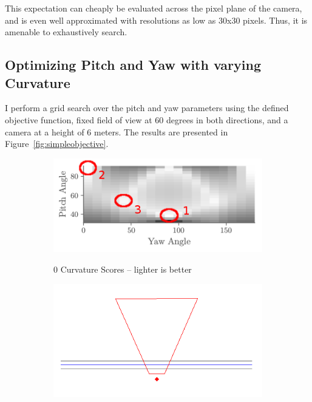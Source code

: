 \documentclass[a4paper,12pt,twoside,openright]{report}
\begin{document}
This expectation can cheaply be evaluated across the pixel plane of the camera, and is even
well approximated with resolutions as low as 30x30 pixels. Thus, it is amenable
to exhaustively search.

\subsection{Optimizing Pitch and Yaw with varying Curvature}

I perform a grid search over the pitch and yaw parameters using the defined
objective function, fixed field of view at 60 degrees in both directions,
and a camera at a height of 6 meters. The results are presented in Figure~\ref{fig:simpleobjective}.

\begin{figure}[h!]
    \begin{subfigure}[b]{0.45\textwidth}
    \centering
    \includegraphics[width=\textwidth]{figures/simple_objective/pitch_yaw_0_curvature_annotated.png}
    \label{fig:simpleobjective:0curvature}
    \caption{0 Curvature Scores -- lighter is better}
\end{subfigure}
\begin{subfigure}[b]{0.45\textwidth}
    \centering
    \includegraphics[width=\textwidth]{figures/simple_objective/0_curvature_bestpos_small.png}

\end{subfigure}
\end{figure}
\end{document}
